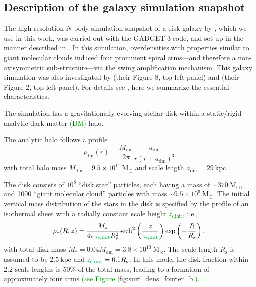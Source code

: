\documentclass[iop,revtex4,numberedappendix,appendixfloats]{emulateapj}
\newcommand{\NEW}[1]{\textcolor{Green}{#1}}
\newcommand{\OLD}[1]{}
\begin{document}
\begin{figure}[!htbp]
\label{fig:simulation}
\end{figure}

\subsection{Description of the galaxy simulation snapshot} \label{sec:simulation_description}

The high-resolution $N$-body simulation snapshot of a disk galaxy by \citet{2013ApJ...766...34D}, which we use in this work, was carried out with the GADGET-3 code, and set up in the manner described in \citet{2005MNRAS.361..776S}. In this simulation, overdensities with properties similar to giant molecular clouds induced four prominent spiral arms---and therefore a non-axisymmetric sub-structure---via the swing amplification mechanism. This galaxy simulation was also investigated by \citet{2013ApJ...766...34D} (their Figure 8, top left panel) and \citet{2015ApJ...808L...8D} (their Figure 2, top left panel). For details see \citet{2013ApJ...766...34D}, here we summarize the essential characteristics.

The simulation has a gravitationally evolving stellar disk within a static/rigid analytic dark matter \NEW{(DM)} halo.

The analytic halo follows a \citet{1990ApJ...356..359H} profile
\begin{equation}
\rho_\text{dm}(r) = \frac{M_\text{dm}}{2\pi} \frac{a_\text{dm}}{r (r+a_\text{dm})^3} \label{eq:dm_hernquist}
\end{equation}
with total halo mass $M_\text{dm} = 9.5\times 10^{11} ~\text{M}_\odot$ and scale length $a_\text{dm} = 29~\text{kpc}$.

The disk consists of $10^8$ ``disk star'' particles, each having a mass of $\sim370 ~\text{M}_\odot$, and 1000 ``giant molecular cloud'' particles with mass $\sim9.5\times 10^{5} ~\text{M}_\odot$. The initial vertical mass distribution of the stars in the disk is specified by the profile of an isothermal sheet with a radially constant scale height \OLD{$z_0$}\NEW{$z_\text{s,init}$}, i.e.,
\begin{equation}
\rho_*(R,z) = \frac{M_*}{4\pi \OLD{z_0}\NEW{z_\text{s,init}} R_\text{s}^2} \text{sech}^2 \left( \frac{z}{\OLD{z_0}\NEW{z_\text{s,init}}}\right) \exp \left(- \frac{R}{R_\text{s}} \right), \label{eq:sech_disk}
\end{equation}
with total disk mass $M_* = 0.04 M_\text{dm} = 3.8\times 10^{10}~\text{M}_\odot$. The scale-length $R_\text{s}$ is assumed to be $2.5~\text{kpc}$ and $\OLD{z_0}\NEW{z_\text{s,init}}=0.1 R_\text{s}$. In this model the disk fraction within $2.2$ scale lengths is 50\% of the total mass, leading to a formation of approximately four arms \citep{2015ApJ...808L...8D} \NEW{(see Figure \ref{fig:surf_dens_fourier_b})}.
\end{document}
